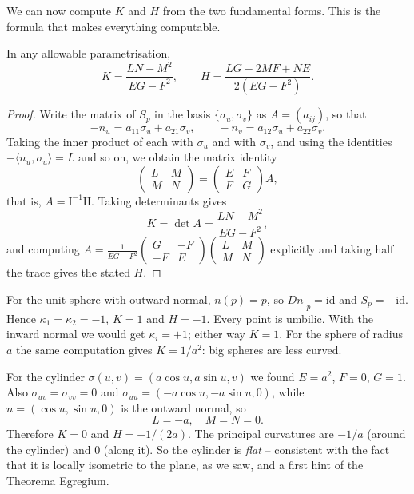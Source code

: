 \documentclass[a4paper]{scrartcl}
\begin{document}
We can now compute $K$ and $H$ from the two fundamental forms. This is the formula that makes everything computable.

\begin{proposition}
    In any allowable parametrisation,
    $$
    K = \frac{LN - M^2}{EG - F^2}, \qquad H = \frac{LG - 2MF + NE}{2(EG-F^2)}.
    $$
\end{proposition}
\begin{proof}
    Write the matrix of $S_p$ in the basis $\{\sigma_u, \sigma_v\}$ as $A = (a_{ij})$, so that
    $$
    -n_u = a_{11}\sigma_u + a_{21}\sigma_v, \qquad -n_v = a_{12}\sigma_u + a_{22}\sigma_v.
    $$
    Taking the inner product of each with $\sigma_u$ and with $\sigma_v$, and using the identities $-\langle n_u, \sigma_u\rangle = L$ and so on, we obtain the matrix identity
    $$
    \begin{pmatrix} L & M \\ M & N\end{pmatrix} = \begin{pmatrix} E & F \\ F & G\end{pmatrix} A,
    $$
    that is, $A = \mathrm{I}^{-1}\mathrm{II}$. Taking determinants gives
    $$
    K = \det A = \frac{LN-M^2}{EG-F^2},
    $$
    and computing $A = \frac{1}{EG-F^2}\begin{pmatrix} G & -F \\ -F & E\end{pmatrix}\begin{pmatrix} L & M \\ M & N \end{pmatrix}$ explicitly and taking half the trace gives the stated $H$.
\end{proof}

\begin{example}
    For the unit sphere with outward normal, $n(p) = p$, so $\left.Dn\right|_p = \mathrm{id}$ and $S_p = -\mathrm{id}$. Hence $\kappa_1 = \kappa_2 = -1$, $K = 1$ and $H = -1$. Every point is umbilic. With the inward normal we would get $\kappa_i = +1$; either way $K = 1$. For the sphere of radius $a$ the same computation gives $K = 1/a^2$: big spheres are less curved.
\end{example}

\begin{example}
    For the cylinder $\sigma(u,v) = (a\cos u, a\sin u, v)$ we found $E = a^2$, $F = 0$, $G=1$. Also $\sigma_{uv} = \sigma_{vv} = 0$ and $\sigma_{uu} = (-a\cos u, -a\sin u, 0)$, while $n = (\cos u, \sin u, 0)$ is the outward normal, so
    $$
    L = -a, \quad M = N = 0.
    $$
    Therefore $K = 0$ and $H = -1/(2a)$. The principal curvatures are $-1/a$ (around the cylinder) and $0$ (along it). So the cylinder is \emph{flat} -- consistent with the fact that it is locally isometric to the plane, as we saw, and a first hint of the Theorema Egregium.
\end{example}
\end{document}
